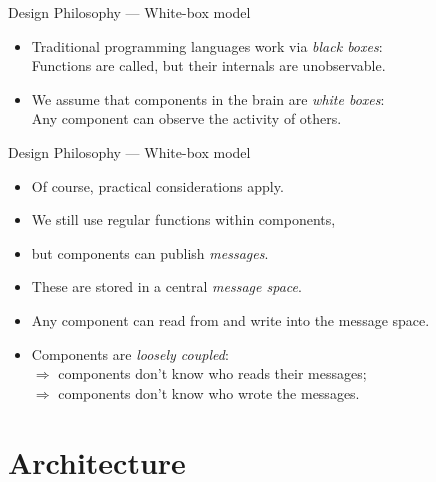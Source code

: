 \documentclass{beamer}
\begin{document}
   \begin{frame}{Design Philosophy --- White-box model}
      \begin{itemize}
         \item Traditional programming languages work via \emph{black boxes}:\\
              \vspace{2mm}
               Functions are called, but their internals are unobservable.
               \vspace{4mm}
         \item We assume that components in the brain are \emph{white boxes}:\\
              \vspace{2mm}
               Any component can observe the activity of others.
      \end{itemize}
   \end{frame}
   
   \begin{frame}{Design Philosophy --- White-box model}
      \begin{itemize}
         \item Of course, practical considerations apply.
         \medskip
         \item We still use regular functions within components,
         \item but components can publish \emph{messages}.
         \medskip
         \item These are stored in a central \emph{message space}.
         \medskip
         \item Any component can read from and write into the message space.
         \vspace{8mm}
         \item Components are \emph{loosely coupled}:\\
            $\Rightarrow$ components don't know who reads their messages;\\
            $\Rightarrow$ components don't know who wrote the messages.
      \end{itemize}
   \end{frame}
   
   \section{Architecture}
   
\end{document}
